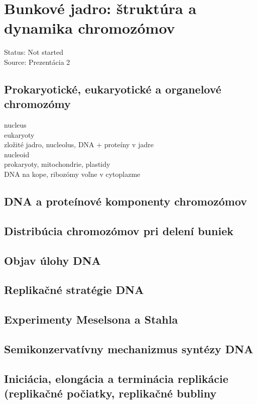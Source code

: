 \section{Bunkové jadro: štruktúra a dynamika chromozómov}
Status: Not started\\
Source: Prezentácia 2\\

\subsection{Prokaryotické, eukaryotické a organelové chromozómy}
nucleus\\
\tab eukaryoty\\
\tab zložité jadro, nucleolus, DNA + proteíny v jadre\\
nucleoid\\
\tab prokaryoty, mitochondrie, plastidy\\
\tab DNA na kope, ribozómy voľne v cytoplazme\\

\subsection{DNA a proteínové komponenty chromozómov}

\subsection{Distribúcia chromozómov pri delení buniek}

\subsection{Objav úlohy DNA}

\subsection{Replikačné stratégie DNA}

\subsection{Experimenty Meselsona a Stahla}

\subsection{Semikonzervatívny mechanizmus syntézy DNA}

\subsection{Iniciácia, elongácia a terminácia replikácie (replikačné počiatky, replikačné bubliny}

